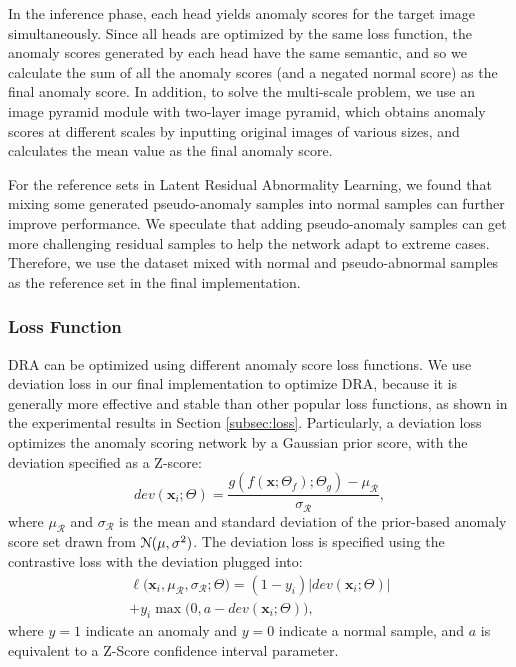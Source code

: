 \documentclass[10pt,twocolumn,letterpaper]{article}
\begin{document}
In the inference phase, each head yields anomaly scores for the target image simultaneously. Since all heads are optimized by the same loss function, the anomaly scores generated by each head have the same semantic, and so we calculate the sum of all the anomaly scores (and a negated normal score) as the final anomaly score. In addition, to solve the multi-scale problem, we use an image pyramid module with two-layer image pyramid, which obtains anomaly scores at different scales by inputting original images of various sizes, and calculates the mean value as the final anomaly score. 

For the reference sets in Latent Residual Abnormality Learning, we found that mixing some generated pseudo-anomaly samples into normal samples can further improve performance. We speculate that adding pseudo-anomaly samples can get more challenging residual samples to help the network adapt to extreme cases. Therefore, we use the dataset mixed with normal and pseudo-abnormal samples as the reference set in the final implementation.

\subsubsection{Loss Function}
DRA can be optimized using different anomaly score loss functions. We use deviation loss \cite{pang2021explainable} in our final implementation to optimize DRA, because it is generally more effective and stable than other popular loss functions, as shown in the experimental results in Section \ref{subsec:loss}. Particularly, a deviation loss optimizes the anomaly scoring network by a Gaussian prior score, with the deviation specified as a Z-score:
\begin{equation}\label{eqn:deviation}
    \mathit{dev}(\mathbf{x}_{i};\Theta) = \frac{g(f (\mathbf{x};\Theta_f);\Theta_{g}) - \mu_{\mathcal{R}}}{\sigma_{\mathcal{R}}},
\end{equation}
where $\mu_{\mathcal{R}}$ and $\sigma_{\mathcal{R}}$ is the mean and standard deviation of the prior-based anomaly score set drawn from ${\cal N} (\mu, \sigma^{2})$. The deviation loss is specified using the contrastive loss \cite{hadsell2006contrastloss} with the deviation plugged into:
\begin{multline}\label{eqn:loss}
    \ell\big(\mathbf{x}_{i}, \mu_{\mathcal{R}}, \sigma_{\mathcal{R}};\Theta \big) = (1-y_{i})|\mathit{dev}(\mathbf{x}_{i};\Theta)|\\ + y_{i} \max\big(0, a - \mathit{dev}(\mathbf{x}_{i};\Theta)\big),
\end{multline}
where $y = 1$ indicate an anomaly and $y = 0$ indicate a normal sample,
and $a$ is equivalent to a Z-Score confidence interval parameter.
\end{document}
